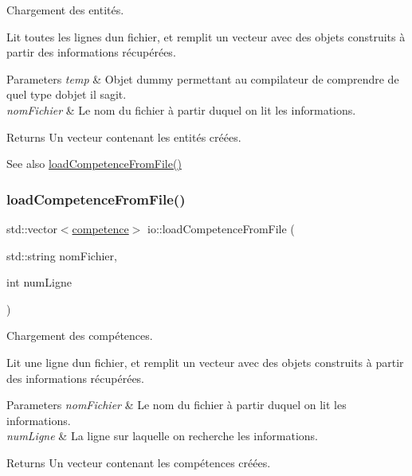 Chargement des entités. 

Lit toutes les lignes d\textquotesingle{}un fichier, et remplit un vecteur avec des objets construits à partir des informations récupérées. 
\begin{DoxyParams}{Parameters}
{\em temp} & Objet dummy permettant au compilateur de comprendre de quel type d\textquotesingle{}objet il s\textquotesingle{}agit. \\
\hline
{\em nom\+Fichier} & Le nom du fichier à partir duquel on lit les informations. \\
\hline
\end{DoxyParams}
\begin{DoxyReturn}{Returns}
Un vecteur contenant les entités créées. 
\end{DoxyReturn}
\begin{DoxySeeAlso}{See also}
\hyperlink{namespaceio_a9297653474b9ce9930d6a3862401e751}{load\+Competence\+From\+File()} 
\end{DoxySeeAlso}
\mbox{\label{namespaceio_a9297653474b9ce9930d6a3862401e751}} 
\subsubsection{\texorpdfstring{load\+Competence\+From\+File()}{loadCompetenceFromFile()}}
{\footnotesize\ttfamily std\+::vector$<$\hyperlink{classcompetence}{competence}$>$ io\+::load\+Competence\+From\+File (\begin{DoxyParamCaption}\item[{std\+::string}]{nom\+Fichier,  }\item[{int}]{num\+Ligne }\end{DoxyParamCaption})}



Chargement des compétences. 

Lit une ligne d\textquotesingle{}un fichier, et remplit un vecteur avec des objets construits à partir des informations récupérées. 
\begin{DoxyParams}{Parameters}
{\em nom\+Fichier} & Le nom du fichier à partir duquel on lit les informations. \\
\hline
{\em num\+Ligne} & La ligne sur laquelle on recherche les informations. \\
\hline
\end{DoxyParams}
\begin{DoxyReturn}{Returns}
Un vecteur contenant les compétences créées. 
\end{DoxyReturn}
\mbox{\label{namespaceio_ab044be3afd7ac04eeb1a496af0f1d5c6}} 
